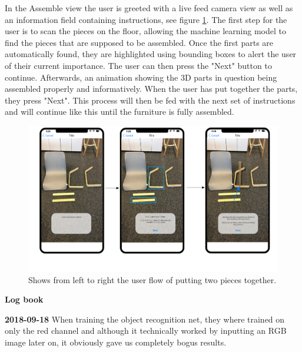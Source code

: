 In the Assemble view the user is greeted with a live feed camera view as well as an information field containing instructions, see figure \ref{fig:assemble-view}. The first step for the user is to scan the pieces on the floor, allowing the machine learning model to find the pieces that are supposed to be assembled. Once the first parts are automatically found, they are highlighted using bounding boxes to alert the user of their current importance. The user can then press the "Next" button to continue. Afterwards, an animation showing the 3D parts in question being assembled properly and informatively. When the user has put together the parts, they press "Next". This process will then be fed with the next set of instructions and will continue like this until the furniture is fully assembled.
\begin{figure}[!hbt]
\begin{center}
\includegraphics[height = 0.4\textheight]{./Images/AR_Scene.png}
\caption{Shows from left to right the user flow of putting two pieces together.}
\label{fig:assemble-view}
\end{center}
\end{figure}
\newpage

\begin{center}
\textbf{Log book}
\end{center}

\textbf{2018-09-18}
When training the object recognition net, they where trained on only the red channel and although it technically worked by inputting an RGB image later on, it obviously gave us completely bogus results.